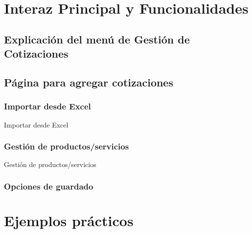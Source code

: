 \documentclass{Pretexto/bluereport}
\begin{document}
\section{Interaz Principal y Funcionalidades}
\subsection{Explicación del menú de Gestión de Cotizaciones}
\subsection{Página para agregar cotizaciones}
\subsubsection{Importar desde Excel}
Importar desde Excel
\subsubsection{Gestión de productos/servicios}
Gestión de productos/servicios
\subsubsection{Opciones de guardado}

\section{Ejemplos prácticos}
\end{document}
